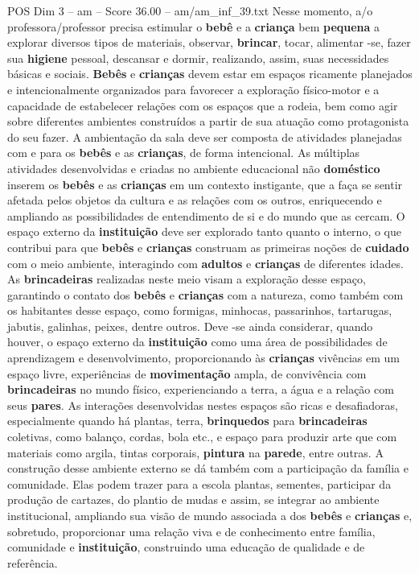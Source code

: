 \begin{textsample}{POS Dim 3 – am – Score 36.00 – am/am\_inf\_39.txt}
Nesse momento, a/o professora/professor precisa estimular o \textbf{bebê} e a \textbf{criança} bem \textbf{pequena} a explorar diversos tipos de materiais, observar, \textbf{brincar}, tocar, alimentar -se, fazer sua \textbf{higiene} pessoal, descansar e dormir, realizando, assim, suas necessidades básicas e sociais. \textbf{Bebês} e \textbf{crianças} devem estar em espaços ricamente planejados e intencionalmente organizados para favorecer a exploração físico-motor e a capacidade de estabelecer relações com os espaços que a rodeia, bem como agir sobre diferentes ambientes construídos a partir de sua atuação como protagonista do seu fazer.
A ambientação da sala deve ser composta de atividades planejadas com e para os \textbf{bebês} e as \textbf{crianças}, de forma intencional.
As múltiplas atividades desenvolvidas e criadas no ambiente educacional não \textbf{doméstico} inserem os \textbf{bebês} e as \textbf{crianças} em um contexto instigante, que a faça se sentir afetada pelos objetos da cultura e as relações com os outros, enriquecendo e ampliando as possibilidades de entendimento de si e do mundo que as cercam.
O espaço externo da \textbf{instituição} deve ser explorado tanto quanto o interno, o que contribui para que \textbf{bebês} e \textbf{crianças} construam as primeiras noções de \textbf{cuidado} com o meio ambiente, interagindo com \textbf{adultos} e \textbf{crianças} de diferentes idades.
As \textbf{brincadeiras} realizadas neste meio visam a exploração desse espaço, garantindo o contato dos \textbf{bebês} e \textbf{crianças} com a natureza, como também com os habitantes desse espaço, como formigas, minhocas, passarinhos, tartarugas, jabutis, galinhas, peixes, dentre outros.
Deve -se ainda considerar, quando houver, o espaço externo da \textbf{instituição} como uma área de possibilidades de aprendizagem e desenvolvimento, proporcionando às \textbf{crianças} vivências em um espaço livre, experiências de \textbf{movimentação} ampla, de convivência com \textbf{brincadeiras} no mundo físico, experienciando a terra, a água e a relação com seus \textbf{pares}.
As interações desenvolvidas nestes espaços são ricas e desafiadoras, especialmente quando há plantas, terra, \textbf{brinquedos} para \textbf{brincadeiras} coletivas, como balanço, cordas, bola etc., e espaço para produzir arte que com materiais como argila, tintas corporais, \textbf{pintura} na \textbf{parede}, entre outras.
A construção desse ambiente externo se dá também com a participação da família e comunidade.
Elas podem trazer para a escola plantas, sementes, participar da produção de cartazes, do plantio de mudas e assim, se integrar ao ambiente institucional, ampliando sua visão de mundo associada a dos \textbf{bebês} e \textbf{crianças} e, sobretudo, proporcionar uma relação viva e de conhecimento entre família, comunidade e \textbf{instituição}, construindo uma educação de qualidade e de referência.

\end{textsample}
